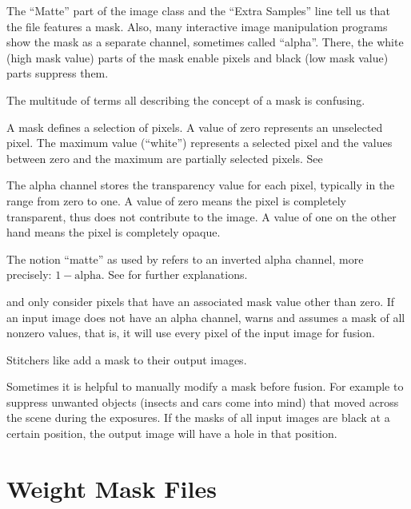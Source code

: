 %
%
%
The ``Matte'' part of the image class and the ``Extra Samples'' line tell us that the file
features a mask.  Also, many interactive image manipulation programs show the mask as a separate
channel, sometimes called ``alpha''.  There, the white (high mask value) parts of the mask
enable pixels and black (low mask value) parts suppress them.

The multitude of terms all describing the concept of a mask is confusing.

\begin{description}
\item[Mask]\itemend
  A mask defines a selection of pixels.  A value of zero represents an unselected pixel.  The
  maximum value (``white'') represents a selected pixel and the values between zero and the
  maximum are partially selected pixels.  See 

\item[Alpha Channel]\itemend
  The alpha channel stores the transparency value for each pixel, typically in the range from
  zero to one.  A value of zero means the pixel is completely transparent, thus does not
  contribute to the image.  A value of one on the other hand means the pixel is completely
  opaque.

\item[Matte]\itemend
  The notion ``matte'' as used by  refers to an inverted alpha channel,
  more precisely: $1 - \mbox{alpha}$.  See
   for further explanations.
\end{description}

\App{} and \OtherApp{} only consider pixels that have an associated mask value other than zero.
If an input image does not have an alpha channel,  warns and assumes a mask
of all nonzero values, that is, it will use every pixel of the input image for fusion.

%
Stitchers like  add a mask to their output images.

Sometimes it is helpful to manually modify a mask before fusion.  For example to suppress
unwanted objects (insects and cars come into mind) that moved across the scene during the
exposures.  If the masks of all input images are black at a certain position, the output image
will have a hole in that position.


\section[Weight Mask Files]{\label{sec:weight-mask-files}%
  Weight Mask Files}




